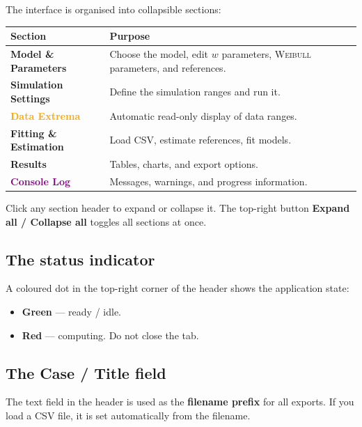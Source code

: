 \documentclass[11pt,a4paper]{article}
\newcommand{\Weibull}{\textsc{Weibull}}
\begin{document}
The interface is organised into collapsible sections:

\begin{center}
\begin{tabularx}{\textwidth}{lX}
\toprule
\textbf{Section} & \textbf{Purpose} \\
\midrule
\textcolor{bluehl}{\textbf{Model \& Parameters}} & Choose the model, edit $w$ parameters, \Weibull{} parameters, and references. \\
\textcolor{greenhl}{\textbf{Simulation Settings}} & Define the simulation ranges and run it. \\
\textcolor{orange}{\textbf{Data Extrema}} & Automatic read-only display of data ranges. \\
\textcolor{redhl}{\textbf{Fitting \& Estimation}} & Load CSV, estimate references, fit models. \\
\textcolor{accent}{\textbf{Results}} & Tables, charts, and export options. \\
\textcolor{purple}{\textbf{Console Log}} & Messages, warnings, and progress information. \\
\bottomrule
\end{tabularx}
\end{center}

Click any section header to expand or collapse it. The top-right button \textbf{Expand all / Collapse all} toggles all sections at once.

\subsection{The status indicator}

A coloured dot in the top-right corner of the header shows the application state:
\begin{itemize}[leftmargin=1.4em]
  \item \textcolor{greenhl}{\textbf{Green}} --- ready / idle.
  \item \textcolor{redhl}{\textbf{Red}} --- computing. Do not close the tab.
\end{itemize}

\subsection{The Case / Title field}

The text field in the header is used as the \textbf{filename prefix} for all exports. If you load a CSV file, it is set automatically from the filename.
\end{document}
